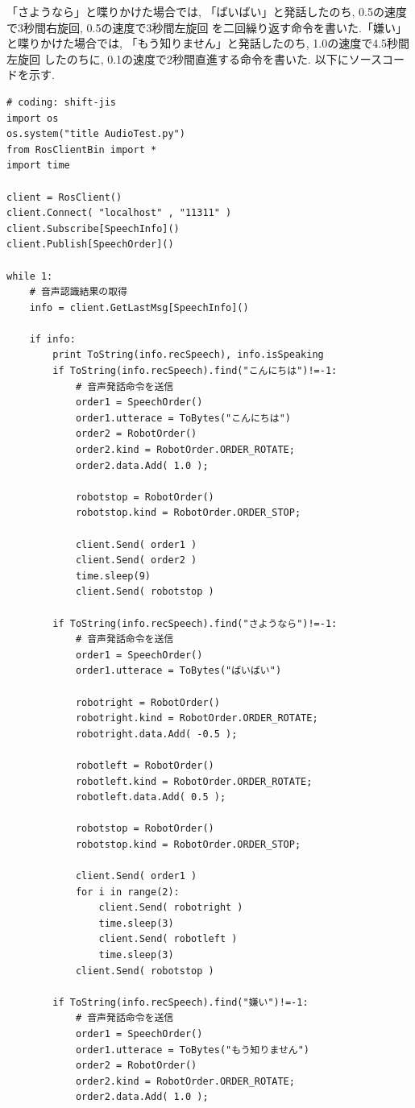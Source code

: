 \documentclass[a4paper,11pt,titlepage]{jsarticle}
\begin{document}
「さようなら」と喋りかけた場合では, 「ばいばい」と発話したのち, 0.5の速度で3秒間右旋回, 0.5の速度で3秒間左旋回
を二回繰り返す命令を書いた.「嫌い」と喋りかけた場合では, 「もう知りません」と発話したのち, 1.0の速度で4.5秒間左旋回
したのちに, 0.1の速度で2秒間直進する命令を書いた.
以下にソースコードを示す.
\begin{lstlisting}[basicstyle=\ttfamily\footnotesize, caption = AudioTest.py, breaklines = true]
# coding: shift-jis
import os
os.system("title AudioTest.py")
from RosClientBin import *
import time

client = RosClient()
client.Connect( "localhost" , "11311" )
client.Subscribe[SpeechInfo]()
client.Publish[SpeechOrder]()

while 1:
    # 音声認識結果の取得
    info = client.GetLastMsg[SpeechInfo]()

    if info:
        print ToString(info.recSpeech), info.isSpeaking
        if ToString(info.recSpeech).find("こんにちは")!=-1:
            # 音声発話命令を送信
            order1 = SpeechOrder()
            order1.utterace = ToBytes("こんにちは")
            order2 = RobotOrder()
            order2.kind = RobotOrder.ORDER_ROTATE;
            order2.data.Add( 1.0 );

            robotstop = RobotOrder()
            robotstop.kind = RobotOrder.ORDER_STOP;

            client.Send( order1 )
            client.Send( order2 )
            time.sleep(9)
            client.Send( robotstop )

        if ToString(info.recSpeech).find("さようなら")!=-1:
            # 音声発話命令を送信
            order1 = SpeechOrder()
            order1.utterace = ToBytes("ばいばい")

            robotright = RobotOrder()
            robotright.kind = RobotOrder.ORDER_ROTATE;
            robotright.data.Add( -0.5 );

            robotleft = RobotOrder()
            robotleft.kind = RobotOrder.ORDER_ROTATE;
            robotleft.data.Add( 0.5 );

            robotstop = RobotOrder()
            robotstop.kind = RobotOrder.ORDER_STOP;

            client.Send( order1 )
            for i in range(2):
                client.Send( robotright )
                time.sleep(3)
                client.Send( robotleft )
                time.sleep(3)
            client.Send( robotstop )

        if ToString(info.recSpeech).find("嫌い")!=-1:
            # 音声発話命令を送信
            order1 = SpeechOrder()
            order1.utterace = ToBytes("もう知りません")
            order2 = RobotOrder()
            order2.kind = RobotOrder.ORDER_ROTATE;
            order2.data.Add( 1.0 );


\end{lstlisting}
\end{document}
